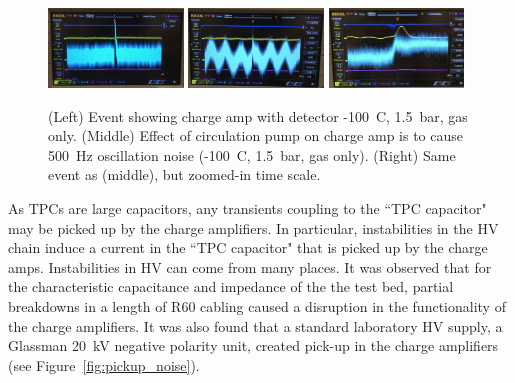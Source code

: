  \begin{figure}[htbp]
\begin{center}
\includegraphics[width = 0.32\textwidth, keepaspectratio]{figures/testbed/circ_off.png}
\includegraphics[width = 0.32\textwidth, keepaspectratio]{figures/testbed/circ_noise.png}
\includegraphics[width = 0.32\textwidth, keepaspectratio]{figures/testbed/circ_noise_zoom.png}
\caption{(Left) Event showing charge amp with detector -100~C, 1.5~bar, gas only. (Middle) Effect of circulation pump on charge amp is to cause 500~Hz oscillation noise (-100~C, 1.5~bar, gas only). (Right) Same event as (middle), but zoomed-in time scale.}
\label{fig:amp_noise}
\end{center}
\end{figure}




As \ac{TPC}s are large capacitors, any transients coupling to the ``TPC capacitor" may be picked up by the charge amplifiers. In particular, instabilities in the \ac{HV} chain induce a current in the ``TPC capacitor" that is picked up by the charge amps. Instabilities in \ac{HV} can come from many places. It was observed that for the characteristic capacitance and impedance of the the test bed, partial breakdowns in a length of R60 cabling caused a disruption in the functionality of the charge amplifiers. It was also found that a standard laboratory \ac{HV} supply, a Glassman 20~kV negative polarity unit, created pick-up in the charge amplifiers (see Figure~\ref{fig:pickup_noise}).  


